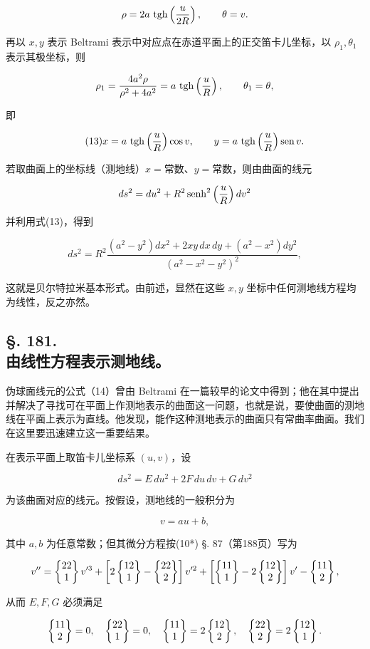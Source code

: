 \[
 \rho=2a\,\operatorname{tgh}\left(\frac u{2R}\right),\qquad \theta=v.
\]

再以 $x,y$ 表示 Beltrami 表示中对应点在赤道平面上的正交笛卡儿坐标，以 $\rho_1,\theta_1$ 表示其极坐标，则

\[
 \rho_1=\frac{4a^2\rho}{\rho^2+4a^2}=a\,\operatorname{tgh}\left(\frac uR\right),\qquad \theta_1=\theta,
\]

即

\[
\tag{13}
 x=a\,\operatorname{tgh}\left(\frac uR\right)\cos v,
 \qquad
 y=a\,\operatorname{tgh}\left(\frac uR\right)\operatorname{sen} v.
\]

若取曲面上的坐标线（测地线）\(x=\text{常数}\)、\(y=\text{常数}\)，则由曲面的线元

\[
 ds^2=du^2+R^2\operatorname{senh}^2\left(\frac uR\right)dv^2
\]

并利用式(13)，得到

\[
\tag{14}
 ds^2=R^2\frac{(a^2-y^2)dx^2+2xy\,dx\,dy+(a^2-x^2)dy^2}{(a^2-x^2-y^2)^2},
\]

这就是贝尔特拉米基本形式。由前述，显然在这些 $x,y$ 坐标中任何测地线方程均为线性，反之亦然。



\subsection*{§. 181.\\ 由线性方程表示测地线。}



伪球面线元的公式（14）曾由 Beltrami 在一篇较早的论文中得到；他在其中提出并解决了寻找可在平面上作测地表示的曲面这一问题，也就是说，要使曲面的测地线在平面上表示为直线。他发现，能作这种测地表示的曲面只有常曲率曲面。我们在这里要迅速建立这一重要结果。



在表示平面上取笛卡儿坐标系 $(u,v)$，设

\[
 ds^2=E\,du^2+2F\,du\,dv+G\,dv^2
\]

为该曲面对应的线元。按假设，测地线的一般积分为

\[
 v=au+b,
\]

其中 \(a,b\) 为任意常数；但其微分方程按(10*) §. 87（第188页）写为

\[
 v''=\left\{\begin{matrix}22\\1\end{matrix}\right\}v'^3+\left[2\left\{\begin{matrix}12\\1\end{matrix}\right\}-\left\{\begin{matrix}22\\2\end{matrix}\right\}\right]v'^2+
 \left[\left\{\begin{matrix}11\\1\end{matrix}\right\}-2\left\{\begin{matrix}12\\2\end{matrix}\right\}\right]v'-\left\{\begin{matrix}11\\2\end{matrix}\right\},
\]

从而 \(E,F,G\) 必须满足

\[
 \left\{\begin{matrix}11\\2\end{matrix}\right\}=0,
 \quad \left\{\begin{matrix}22\\1\end{matrix}\right\}=0,
 \quad
 \left\{\begin{matrix}11\\1\end{matrix}\right\}=2\left\{\begin{matrix}12\\2\end{matrix}\right\},
 \quad
 \left\{\begin{matrix}22\\2\end{matrix}\right\}=2\left\{\begin{matrix}12\\1\end{matrix}\right\}.
\]

